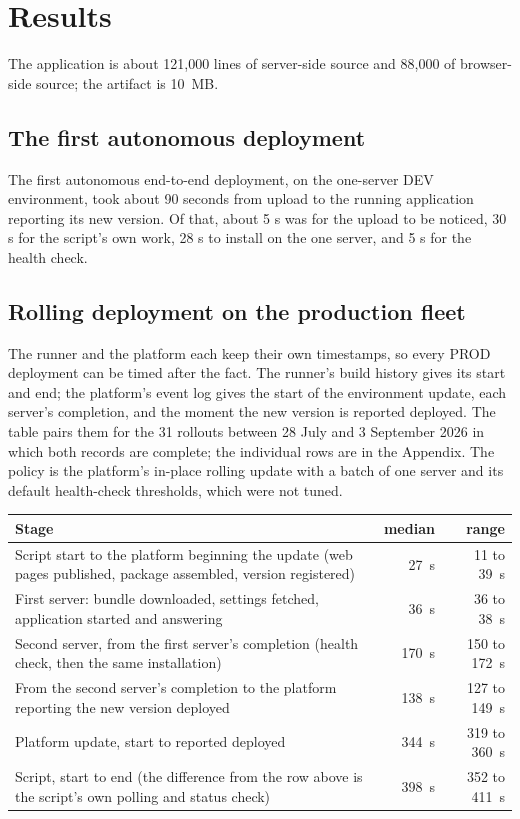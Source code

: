 \documentclass[11pt]{article}
\begin{document}
\section{Results}

The application is about 121{,}000 lines of server-side source and 88{,}000 of browser-side source; the artifact is 10~MB.

\subsection{The first autonomous deployment}

The first autonomous end-to-end deployment, on the one-server DEV environment, took about 90 seconds from upload to the running application reporting its new version. Of that, about 5 s was for the upload to be noticed, 30 s for the script's own work, 28 s to install on the one server, and 5 s for the health check.

\subsection{Rolling deployment on the production fleet}

The runner and the platform each keep their own timestamps, so every PROD deployment can be timed after the fact. The runner's build history gives its start and end; the platform's event log gives the start of the environment update, each server's completion, and the moment the new version is reported deployed. The table pairs them for the 31 rollouts between 28 July and 3 September 2026 in which both records are complete; the individual rows are in the Appendix. The policy is the platform's in-place rolling update with a batch of one server and its default health-check thresholds, which were not tuned.

\begin{center}
\begin{tabularx}{\textwidth}{@{}Xrr@{}}
\toprule
Stage & median & range \\
\midrule
Script start to the platform beginning the update (web pages published, package assembled, version registered) & 27~s & 11 to 39~s \\
First server: bundle downloaded, settings fetched, application started and answering & 36~s & 36 to 38~s \\
Second server, from the first server's completion (health check, then the same installation) & 170~s & 150 to 172~s \\
From the second server's completion to the platform reporting the new version deployed & 138~s & 127 to 149~s \\
Platform update, start to reported deployed & 344~s & 319 to 360~s \\
Script, start to end (the difference from the row above is the script's own polling and status check) & 398~s & 352 to 411~s \\
\bottomrule
\end{tabularx}
\end{center}
\end{document}
